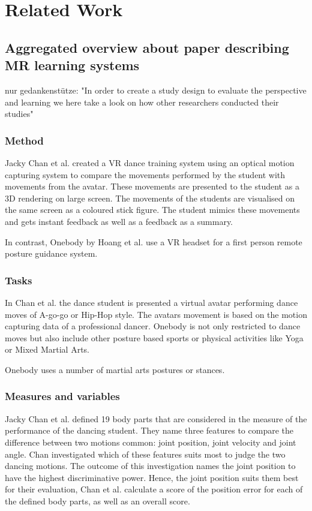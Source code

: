 \chapter{Related Work}

\section{Aggregated overview about paper describing MR learning systems}
nur gedankenstütze: "In order to create a study design to evaluate the perspective and learning we here take a look on how other researchers conducted their studies"

\subsection{Method}
Jacky Chan et al. \todo created a VR dance training system using an optical motion capturing system to compare the movements performed by the student with movements from the avatar. These movements are presented to the student as a 3D rendering on large screen. The movements of the students are visualised on the same screen as a coloured stick figure. The student mimics these movements and gets instant feedback as well as a feedback as a summary.

In contrast, Onebody by Hoang et al. \todo use a VR headset for a first person remote posture guidance system. 

\subsection{Tasks}
In Chan et al. \todo the dance student is presented a virtual avatar performing dance moves of A-go-go or Hip-Hop style. The avatars movement is based on the motion capturing data of a professional dancer. Onebody \todo is not only restricted to dance moves but also include other posture based sports or physical activities like Yoga or Mixed Martial Arts.

Onebody \todo uses a number of martial arts postures or stances.

\subsection{Measures and variables}
Jacky Chan et al. \todo defined 19 body parts that are considered in the measure of the performance of the dancing student. They name three features to compare the difference between two motions common: joint position, joint velocity and joint angle. Chan investigated which of these features suits most to judge the two dancing motions. The outcome of this investigation names the joint position to have the highest discriminative power. Hence, the joint position suits them best for their evaluation, Chan et al. calculate a score of the position error for each of the defined body parts, as well as an overall score. 

